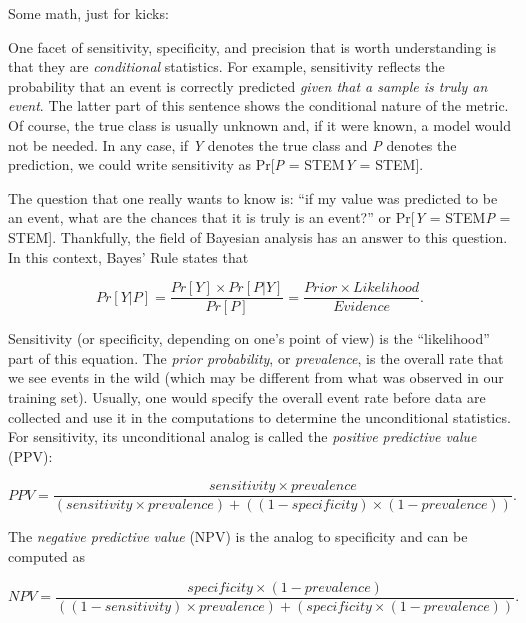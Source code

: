 \documentclass[11pt]{book}
\begin{document}
Some math, just for kicks:

One facet of sensitivity, specificity, and precision that is worth understanding is that they are \emph{conditional} statistics. For example, sensitivity reflects the probability that an event is correctly predicted \emph{given that a sample is truly an event}. The latter part of this sentence shows the conditional nature of the metric. Of course, the true class is usually unknown and, if it were known, a model would not be needed. In any case, if \emph{Y} denotes the true class and \emph{P} denotes the prediction, we could write sensitivity as Pr{[}\emph{P} = STEM\textbar{}\emph{Y} = STEM{]}.

The question that one really wants to know is: ``if my value was predicted to be an event, what are the chances that it is truly is an event?'' or Pr{[}\emph{Y} = STEM\textbar{}\emph{P} = STEM{]}. Thankfully, the field of Bayesian analysis \citep{Rethinking} has an answer to this question. In this context, Bayes' Rule states that

\[Pr[Y|P] = \frac{Pr[Y] \times Pr[P|Y]}{Pr[P]} = \frac{Prior \times Likelihood}{Evidence}.\]

Sensitivity (or specificity, depending on one's point of view) is the ``likelihood'' part of this equation. The \emph{prior probability}, or \emph{prevalence}, is the overall rate that we see events in the wild (which may be different from what was observed in our training set). Usually, one would specify the overall event rate before data are collected and use it in the computations to determine the unconditional statistics. For sensitivity, its unconditional analog is called the \emph{positive predictive value} (PPV):

\[PPV = \frac{sensitivity \times prevalence}{(sensitivity\times prevalence) + ((1-specificity)\times (1-prevalence))}.\]

The \emph{negative predictive value} (NPV) is the analog to specificity and can be computed as

\[NPV = \frac{specificity \times (1-prevalence)}{((1-sensitivity)\times prevalence) + (specificity\times (1-prevalence))}.\]
\end{document}

